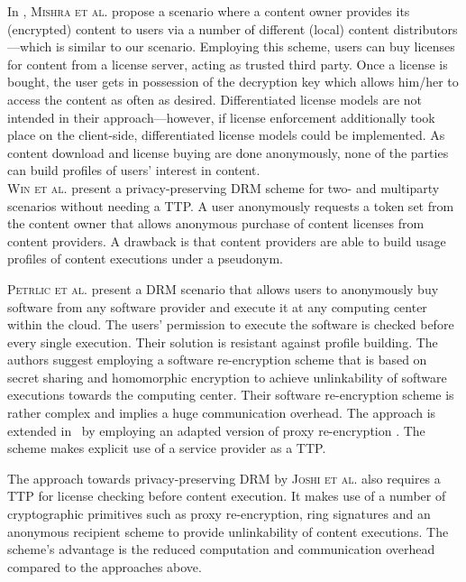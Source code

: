 \documentclass{llncs}
\begin{document}
In \cite{multilevel}, \textsc{Mishra et al.} propose a scenario where a content owner provides its (encrypted) content to users via a number of different (local) content distributors---which is similar to our scenario. Employing this scheme, users can buy licenses for content from a license server, acting as trusted third party. Once a license is bought, the user gets in possession of the decryption key which allows him/her to access the content as often as desired. Differentiated license models are not intended in their approach---however, if license enforcement additionally took place on the client-side, differentiated license models could be implemented. As content download and license buying are done anonymously, none of the parties can build profiles of users' interest in content.\\

\textsc{Win et al.} \cite{nottp} present a privacy-preserving DRM scheme for two- and multiparty scenarios without needing a TTP. A user anonymously requests a token set from the content owner that allows anonymous purchase of content licenses from content providers. A drawback is that content providers are able to build usage profiles of content executions under a pseudonym. 

\textsc{Petrlic et al.} \cite{petrlic1} present a DRM scenario that allows users to anonymously buy software from any software provider and execute it at any computing center within the cloud. The users' permission to execute the software is checked before every single execution. Their solution is resistant against profile building. The authors suggest employing a software re-encryption scheme that is based on secret sharing and homomorphic encryption to achieve unlinkability of software executions towards the computing center. Their software re-encryption scheme is rather complex and implies a huge communication overhead. The approach is extended in~\cite{proxy} by employing an adapted version of proxy re-encryption \cite{ateniese_improved}. The scheme makes explicit use of a service provider as a TTP. 


The approach towards privacy-preserving DRM by \textsc{Joshi et al.} \cite{practical} also requires a TTP for license checking before content execution. It makes use of a number of cryptographic primitives such as proxy re-encryption, ring signatures and an anonymous recipient scheme to provide unlinkability of content executions. The scheme's advantage is the reduced computation and communication overhead compared to the approaches above. 
\end{document}
